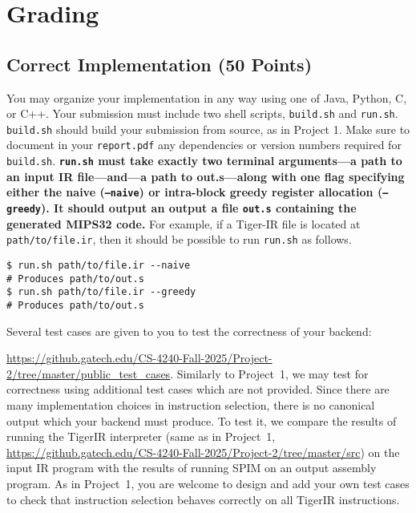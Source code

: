 \documentclass[12pt]{article}
\begin{document}
\section{Grading}
\label{sec:grading}

\subsection{Correct Implementation (50 Points)}
\label{sec:correct}
You may organize your implementation in any way using one of Java, Python, C, or C++. Your submission must include two shell scripts, \texttt{build.sh} and \texttt{run.sh}. \texttt{build.sh} should build your submission from source, as in Project 1. Make sure to document in your \texttt{report.pdf} any dependencies or version numbers required for \texttt{build.sh}. \textbf{\texttt{run.sh} must take exactly two terminal arguments---a path to an input IR file---and---a path to out.s---along with one flag specifying either the naive (\texttt{--naive}) or intra-block greedy register allocation (\texttt{--greedy}). It should output an output a file \texttt{out.s} containing the generated MIPS32 code.} For example, if a Tiger-IR file is located at \texttt{path/to/file.ir}, then it should be possible to run \texttt{run.sh} as follows.
\begin{lstlisting}[]
$ run.sh path/to/file.ir --naive
# Produces path/to/out.s
$ run.sh path/to/file.ir --greedy
# Produces path/to/out.s
\end{lstlisting}


Several test cases are given to you to test the correctness of your backend:

\url{https://github.gatech.edu/CS-4240-Fall-2025/Project-2/tree/master/public_test_cases}. Similarly to Project~1, we may test for correctness using additional test cases which are not provided. Since there are many implementation choices in instruction selection, there is no canonical output which your backend must produce. To test it, we compare the results of running the TigerIR interpreter (same as in Project~1, \url{https://github.gatech.edu/CS-4240-Fall-2025/Project-2/tree/master/src}) on the input IR program with the results of running SPIM on an output assembly program. As in Project~1, you are welcome to design and add your own test cases to check that instruction selection behaves correctly on all TigerIR instructions.
\end{document}
